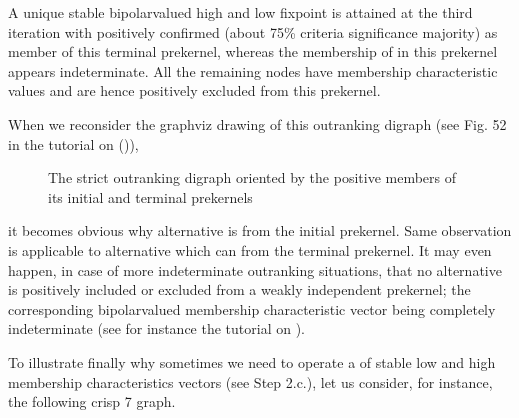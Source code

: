 \documentclass[a4paper,12pt,english]{sphinxhowto}
\let\sphinxpxdimen\pdfpxdimen\else\newdimen\sphinxpxdimen
\begin{document}
\sphinxAtStartPar
A unique stable bipolar\sphinxhyphen{}valued high and low fixpoint is attained at the third iteration with  positively confirmed (about 75\% criteria significance majority) as member of this terminal prekernel, whereas the membership of  in this prekernel appears indeterminate. All the remaining nodes have  membership characteristic values and are hence positively excluded from this prekernel.

\sphinxAtStartPar
When we reconsider the graphviz drawing of this outranking digraph (see Fig. 52  in the tutorial on {\hyperref[\detokenize{pearls:kernel-tutorial-label}]{}} ()),

\begin{figure}[H]
\centering
\capstart

\noindent\sphinxincludegraphics[width=300\sphinxpxdimen]{{bestWorstOrientation}.png}
\caption{The strict outranking digraph oriented by the positive members of its initial and terminal prekernels}\label{\detokenize{pearls:id136}}\end{figure}

\sphinxAtStartPar
it becomes obvious why alternative  is  from the initial prekernel. Same observation is applicable to alternative  which can  from the terminal prekernel. It may even happen, in case of more indeterminate outranking situations, that no alternative  is positively included or excluded from a weakly independent prekernel; the corresponding bipolar\sphinxhyphen{}valued membership characteristic vector being completely indeterminate (see for instance the tutorial on ).

\sphinxAtStartPar
To illustrate finally why sometimes we need to operate a  of  stable low and high membership characteristics vectors (see Step 2.c.), let us consider, for instance, the following crisp 7\sphinxhyphen{} graph.
\end{document}

